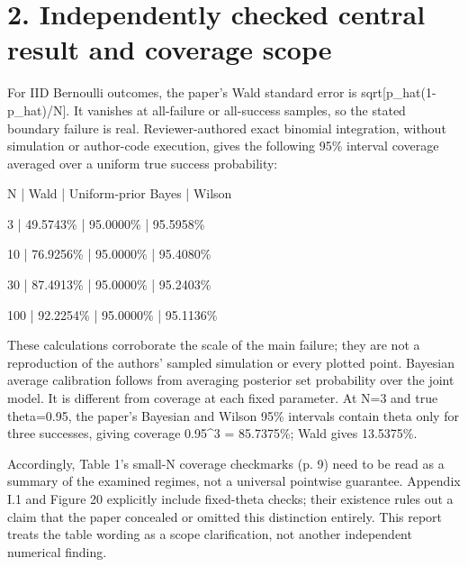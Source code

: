 \documentclass[10pt]{article}
\begin{document}
\section*{2. Independently checked central result and coverage scope}
For IID Bernoulli outcomes, the paper’s Wald standard error is sqrt[p\_hat(1-p\_hat)/N]. It vanishes at all-failure or all-success samples, so the stated boundary failure is real. Reviewer-authored exact binomial integration, without simulation or author-code execution, gives the following 95\% interval coverage averaged over a uniform true success probability:\par
N | Wald | Uniform-prior Bayes | Wilson\par
3 | 49.5743\% | 95.0000\% | 95.5958\%\par
10 | 76.9256\% | 95.0000\% | 95.4080\%\par
30 | 87.4913\% | 95.0000\% | 95.2403\%\par
100 | 92.2254\% | 95.0000\% | 95.1136\%\par
These calculations corroborate the scale of the main failure; they are not a reproduction of the authors’ sampled simulation or every plotted point. Bayesian average calibration follows from averaging posterior set probability over the joint model. It is different from coverage at each fixed parameter. At N=3 and true theta=0.95, the paper’s Bayesian and Wilson 95\% intervals contain theta only for three successes, giving coverage 0.95\textasciicircum{}3 = 85.7375\%; Wald gives 13.5375\%.\par
Accordingly, Table 1’s small-N coverage checkmarks (p. 9) need to be read as a summary of the examined regimes, not a universal pointwise guarantee. Appendix I.1 and Figure 20 explicitly include fixed-theta checks; their existence rules out a claim that the paper concealed or omitted this distinction entirely. This report treats the table wording as a scope clarification, not another independent numerical finding.\par
\end{document}
